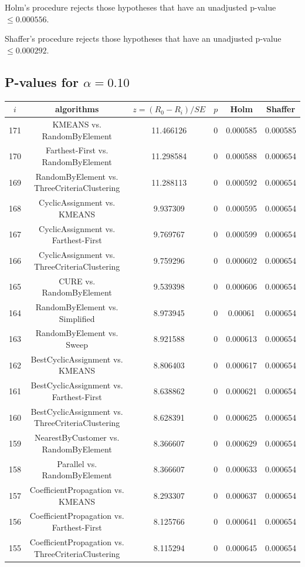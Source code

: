 \documentclass[a4paper,10pt]{article}
\begin{document}
\begin{landscape}
Holm's procedure rejects those hypotheses that have an unadjusted p-value $\le0.000556$.

Shaffer's procedure rejects those hypotheses that have an unadjusted p-value $\le0.000292$.

\pagebreak

\subsection{P-values for $\alpha=0.10$}

\begin{table}[!htp]
\centering\scriptsize
\begin{tabular}{cccccc}
$i$&algorithms&$z=(R_0 - R_i)/SE$&$p$&Holm&Shaffer\\
\hline171&KMEANS vs. RandomByElement&11.466126&0&0.000585&0.000585\\
170&Farthest-First vs. RandomByElement&11.298584&0&0.000588&0.000654\\
169&RandomByElement vs. ThreeCriteriaClustering&11.288113&0&0.000592&0.000654\\
168&CyclicAssignment vs. KMEANS&9.937309&0&0.000595&0.000654\\
167&CyclicAssignment vs. Farthest-First&9.769767&0&0.000599&0.000654\\
166&CyclicAssignment vs. ThreeCriteriaClustering&9.759296&0&0.000602&0.000654\\
165&CURE vs. RandomByElement&9.539398&0&0.000606&0.000654\\
164&RandomByElement vs. Simplified&8.973945&0&0.00061&0.000654\\
163&RandomByElement vs. Sweep&8.921588&0&0.000613&0.000654\\
162&BestCyclicAssignment vs. KMEANS&8.806403&0&0.000617&0.000654\\
161&BestCyclicAssignment vs. Farthest-First&8.638862&0&0.000621&0.000654\\
160&BestCyclicAssignment vs. ThreeCriteriaClustering&8.628391&0&0.000625&0.000654\\
159&NearestByCustomer vs. RandomByElement&8.366607&0&0.000629&0.000654\\
158&Parallel vs. RandomByElement&8.366607&0&0.000633&0.000654\\
157&CoefficientPropagation vs. KMEANS&8.293307&0&0.000637&0.000654\\
156&CoefficientPropagation vs. Farthest-First&8.125766&0&0.000641&0.000654\\
155&CoefficientPropagation vs. ThreeCriteriaClustering&8.115294&0&0.000645&0.000654\\

\end{tabular}
\end{table}
\end{landscape}
\end{document}
